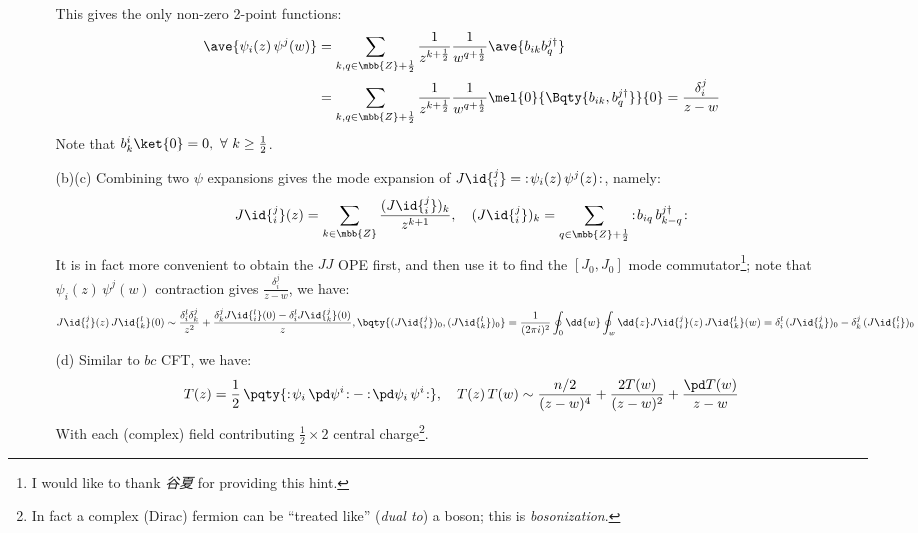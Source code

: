 \documentclass[a4paper,10pt]{article}
\begin{document}
\begin{enumerate}
\begin{enumerate}
	This gives the only non-zero 2-point functions:
	\begin{equation}
	\begin{aligned}
		\ave{
			\psi_i(z)\,\psi^j(w)
		}
		&= \sum_{k,q\in\mbb{Z}+\frac{1}{2}}
			\frac{1}{z^{k+\frac{1}{2}}}
			\frac{1}{w^{q+\frac{1}{2}}}
			\ave{b_{ik} b^{j\dagger}_q} \\
		&= \sum_{k,q\in\mbb{Z}+\frac{1}{2}}
			\frac{1}{z^{k+\frac{1}{2}}}
			\frac{1}{w^{q+\frac{1}{2}}}
			\mel{0}{
				\Bqty{b_{ik},b^{j\dagger}_q}
			}{0}
		= \frac{\delta^j_i}{z-w}
	\end{aligned}
	\end{equation}
	Note that $
		b^i_k\ket{0} = 0,\ %
		\forall\ k\ge\frac{1}{2}
	$. 
	
	\item[(b)(c)] Combining two $\psi$ expansions gives the mode expansion of $
		J\id{_i^j}
		= \normorder{\psi_i(z)\,\psi^j(z)}
	$, namely:
	\begin{equation}
		J\id{_i^j}(z)
		= \sum_{k\in\mbb{Z}}
			\frac{(J\id{_i^j})_k}{z^{k+1}},\quad
		(J\id{_i^j})_k
		= \sum_{q\in\mbb{Z}+\frac{1}{2}}
			\normorder{
				b_{iq}\,b^{j\dagger}_{k-q}
			}
	\end{equation}
	It is in fact more convenient to obtain the $JJ$ OPE first, and then use it to find the  $[J_0,J_0]$ mode commutator\footnote{
		I would like to thank \textit{谷夏} for providing this hint. 
	}; note that $
		{
			{\psi}_i(z)\,{\psi}^j(w)
		}
	$ contraction gives $\frac{\delta^j_i}{z-w}$, we have:
	\begin{equation}
		J\id{_i^j}(z)\,J\id{_k^l}(0)
		\sim \frac{
			\delta_i^l\delta_k^j
		}{z^2} + \frac{
			\delta^j_k J\id{_i^l}(0)
			- \delta^l_i J\id{_k^j}(0)
		}{z},\\[1ex]
		\bqty{
			(J\id{_i^j})_0, (J\id{_k^l})_0
		}
		= \frac{1}{(2\pi i)^2}
			\oint_0 \dd{w}
			\oint_w \dd{z}
				J\id{_i^j}(z)\,J\id{_k^l}(w)
		= \delta_i^l\,(J\id{_k^j})_0
			- \delta_k^j\,(J\id{_i^l})_0
	\end{equation}
	
	\item[(d)] Similar to $bc$ CFT, we have:
	\begin{equation}
		T(z) = \frac{1}{2}\,\pqty{
			\normorder{\psi_i\,\pd\psi^i}
			- \normorder{\pd\psi_i\,\psi^i}
		},\quad
		T(z)\,T(w)
		\sim \frac{n/2}{(z-w)^4}
			+ \frac{2T(w)}{(z-w)^2}
			+ \frac{\pd T(w)}{z-w}
	\end{equation}
	With each (complex) field contributing $\frac{1}{2}\times 2$ central charge\footnote{
		In fact a complex (Dirac) fermion can be ``treated like'' (\textit{dual to}) a boson; this is \textit{bosonization}. 
	}. 
	

\end{enumerate}
\end{enumerate}
\end{document}
